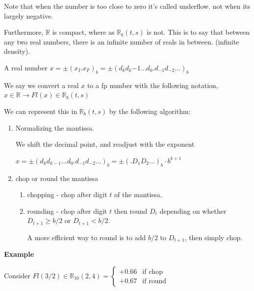 \documentclass{article}
\begin{document}
Note that when the number is too close to zero it's called underflow. not when its largely negative.

\vspace{0.2cm}

Furthermore, $\mathbb R$ is compact, where as $\mathbb R_b(t,s)$ is not. This is to say that between any two real numbers, there is an infinite number of reals in between. (infinite density).

\vspace{0.2cm}

A real number $x = \pm (x_I . x_F)_b = \pm (d_k d_k{-1} \dots d_0 . d_{-1} d_{-2} \dots )_b$

We say we convert a real $x$ to a fp number with the following notation, $x \in \mathbb R \to Fl(x) \in \mathbb R_b(t, s)$

\pagebreak

\text{} 

We can represent this in $\mathbb R_b(t,s)$ by the following algorithm:

\begin{enumerate}
    \item Normalizing the mantissa.
    
    We shift the decimal point, and readjust with the exponent
    
    $x = \pm (d_k d_{k - 1} \dots d_0 . d_{-1} d_{-2} \dots )_b = \pm (.D_1 D_2 \dots )_b \cdot b^{k + 1}$
    
    \item chop or round the mantissa
    
    \begin{enumerate}
        \item chopping - chop after digit $t$ of the mantissa.
        
        \item rounding - chop after digit $t$ then round $D_t$ depending on whether $D_{t + 1} \geq b / 2$ or $D_{t + 1} < b/2$.
        
        A more efficient way to round is to add $b/2$ to $D_{t + 1}$, then simply chop.
    \end{enumerate}
    
\end{enumerate}

\textbf{Example}

Consider $Fl(3/2) \in \mathbb R_{10}(2, 4) = \begin{cases}
+0.66 & \text{if chop}\\
+0.67 & \text{if round}
\end{cases}$
\end{document}
